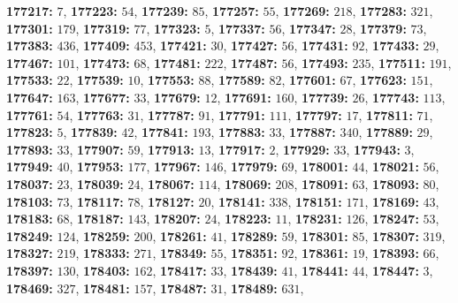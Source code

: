 \textsf{\bfseries 177217:} $7$, \textsf{\bfseries 177223:} $54$, \textsf{\bfseries 177239:} $85$, \textsf{\bfseries 177257:} $55$, \textsf{\bfseries 177269:} $218$, \textsf{\bfseries 177283:} $321$, \textsf{\bfseries 177301:} $179$, \textsf{\bfseries 177319:} $77$, \textsf{\bfseries 177323:} $5$, \textsf{\bfseries 177337:} $56$, \textsf{\bfseries 177347:} $28$, \textsf{\bfseries 177379:} $73$, \textsf{\bfseries 177383:} $436$, \textsf{\bfseries 177409:} $453$, \textsf{\bfseries 177421:} $30$, \textsf{\bfseries 177427:} $56$, \textsf{\bfseries 177431:} $92$, \textsf{\bfseries 177433:} $29$, \textsf{\bfseries 177467:} $101$, \textsf{\bfseries 177473:} $68$, \textsf{\bfseries 177481:} $222$, \textsf{\bfseries 177487:} $56$, \textsf{\bfseries 177493:} $235$, \textsf{\bfseries 177511:} $191$, \textsf{\bfseries 177533:} $22$, \textsf{\bfseries 177539:} $10$, \textsf{\bfseries 177553:} $88$, \textsf{\bfseries 177589:} $82$, \textsf{\bfseries 177601:} $67$, \textsf{\bfseries 177623:} $151$, \textsf{\bfseries 177647:} $163$, \textsf{\bfseries 177677:} $33$, \textsf{\bfseries 177679:} $12$, \textsf{\bfseries 177691:} $160$, \textsf{\bfseries 177739:} $26$, \textsf{\bfseries 177743:} $113$, \textsf{\bfseries 177761:} $54$, \textsf{\bfseries 177763:} $31$, \textsf{\bfseries 177787:} $91$, \textsf{\bfseries 177791:} $111$, \textsf{\bfseries 177797:} $17$, \textsf{\bfseries 177811:} $71$, \textsf{\bfseries 177823:} $5$, \textsf{\bfseries 177839:} $42$, \textsf{\bfseries 177841:} $193$, \textsf{\bfseries 177883:} $33$, \textsf{\bfseries 177887:} $340$, \textsf{\bfseries 177889:} $29$, \textsf{\bfseries 177893:} $33$, \textsf{\bfseries 177907:} $59$, \textsf{\bfseries 177913:} $13$, \textsf{\bfseries 177917:} $2$, \textsf{\bfseries 177929:} $33$, \textsf{\bfseries 177943:} $3$, \textsf{\bfseries 177949:} $40$, \textsf{\bfseries 177953:} $177$, \textsf{\bfseries 177967:} $146$, \textsf{\bfseries 177979:} $69$, \textsf{\bfseries 178001:} $44$, \textsf{\bfseries 178021:} $56$, \textsf{\bfseries 178037:} $23$, \textsf{\bfseries 178039:} $24$, \textsf{\bfseries 178067:} $114$, \textsf{\bfseries 178069:} $208$, \textsf{\bfseries 178091:} $63$, \textsf{\bfseries 178093:} $80$, \textsf{\bfseries 178103:} $73$, \textsf{\bfseries 178117:} $78$, \textsf{\bfseries 178127:} $20$, \textsf{\bfseries 178141:} $338$, \textsf{\bfseries 178151:} $171$, \textsf{\bfseries 178169:} $43$, \textsf{\bfseries 178183:} $68$, \textsf{\bfseries 178187:} $143$, \textsf{\bfseries 178207:} $24$, \textsf{\bfseries 178223:} $11$, \textsf{\bfseries 178231:} $126$, \textsf{\bfseries 178247:} $53$, \textsf{\bfseries 178249:} $124$, \textsf{\bfseries 178259:} $200$, \textsf{\bfseries 178261:} $41$, \textsf{\bfseries 178289:} $59$, \textsf{\bfseries 178301:} $85$, \textsf{\bfseries 178307:} $319$, \textsf{\bfseries 178327:} $219$, \textsf{\bfseries 178333:} $271$, \textsf{\bfseries 178349:} $55$, \textsf{\bfseries 178351:} $92$, \textsf{\bfseries 178361:} $19$, \textsf{\bfseries 178393:} $66$, \textsf{\bfseries 178397:} $130$, \textsf{\bfseries 178403:} $162$, \textsf{\bfseries 178417:} $33$, \textsf{\bfseries 178439:} $41$, \textsf{\bfseries 178441:} $44$, \textsf{\bfseries 178447:} $3$, \textsf{\bfseries 178469:} $327$, \textsf{\bfseries 178481:} $157$, \textsf{\bfseries 178487:} $31$, \textsf{\bfseries 178489:} $631$, 
